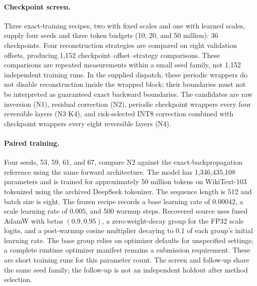 \documentclass[10pt]{article}
\begin{document}
\paragraph{Checkpoint screen.} Three exact-training recipes, two with fixed scales and one with learned scales, supply four seeds and three token budgets (10, 20, and 50 million): 36 checkpoints. Four reconstruction strategies are compared on eight validation offsets, producing 1,152 checkpoint--offset--strategy comparisons. These comparisons are repeated measurements within a small seed family, not 1,152 independent training runs. In the supplied dispatch, these periodic wrappers do not disable reconstruction inside the wrapped block; their boundaries must not be interpreted as guaranteed exact backward boundaries. The candidates are raw inversion (N1), residual correction (N2), periodic checkpoint wrappers every four reversible layers (N3 K4), and risk-selected INT8 correction combined with checkpoint wrappers every eight reversible layers (N4).

\paragraph{Paired training.} Four seeds, 53, 59, 61, and 67, compare N2 against the exact-backpropagation reference using the same forward architecture. The model has 1,346,435,108 parameters and is trained for approximately 50 million tokens on WikiText-103 tokenized using the archived DeepSeek tokenizer. The sequence length is 512 and batch size is eight. The frozen recipe records a base learning rate of $0.00042$, a scale learning rate of $0.005$, and 500 warmup steps. Recovered source uses fused AdamW with betas $(0.9,0.95)$, a zero-weight-decay group for the FP32 scale logits, and a post-warmup cosine multiplier decaying to 0.1 of each group's initial learning rate. The base group relies on optimizer defaults for unspecified settings; a complete runtime optimizer manifest remains a submission requirement. These are short training runs for this parameter count. The screen and follow-up share the same seed family; the follow-up is not an independent holdout after method selection.
\end{document}
